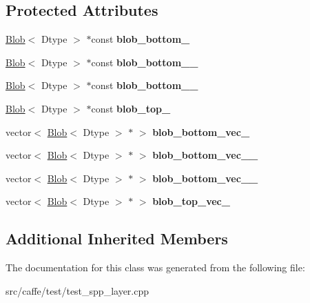 \subsection*{Protected Attributes}
\begin{DoxyCompactItemize}
\item 
\mbox{\label{classcaffe_1_1_s_p_p_layer_test_a3d266526dcb1e6b2292a171839f34f04}} 
\mbox{\hyperlink{classcaffe_1_1_blob}{Blob}}$<$ Dtype $>$ $\ast$const {\bfseries blob\+\_\+bottom\+\_\+}
\item 
\mbox{\label{classcaffe_1_1_s_p_p_layer_test_a2540bbc86b415a5611fcbfc4efa1ef8d}} 
\mbox{\hyperlink{classcaffe_1_1_blob}{Blob}}$<$ Dtype $>$ $\ast$const {\bfseries blob\+\_\+bottom\+\_\+\_\+}
\item 
\mbox{\label{classcaffe_1_1_s_p_p_layer_test_a0982db5f5cb96e571cb3424a46666af8}} 
\mbox{\hyperlink{classcaffe_1_1_blob}{Blob}}$<$ Dtype $>$ $\ast$const {\bfseries blob\+\_\+bottom\+\_\+\_\+}
\item 
\mbox{\label{classcaffe_1_1_s_p_p_layer_test_a018e4388b4f882d0cf4522a494eadcc4}} 
\mbox{\hyperlink{classcaffe_1_1_blob}{Blob}}$<$ Dtype $>$ $\ast$const {\bfseries blob\+\_\+top\+\_\+}
\item 
\mbox{\label{classcaffe_1_1_s_p_p_layer_test_a5103e79478f35ffec4a6ae1d5da611af}} 
vector$<$ \mbox{\hyperlink{classcaffe_1_1_blob}{Blob}}$<$ Dtype $>$ $\ast$ $>$ {\bfseries blob\+\_\+bottom\+\_\+vec\+\_\+}
\item 
\mbox{\label{classcaffe_1_1_s_p_p_layer_test_a230be0a17f73733879881c4a375a17a1}} 
vector$<$ \mbox{\hyperlink{classcaffe_1_1_blob}{Blob}}$<$ Dtype $>$ $\ast$ $>$ {\bfseries blob\+\_\+bottom\+\_\+vec\+\_\+\_\+}
\item 
\mbox{\label{classcaffe_1_1_s_p_p_layer_test_a1144aa3f27192cada385ac245a69fb4a}} 
vector$<$ \mbox{\hyperlink{classcaffe_1_1_blob}{Blob}}$<$ Dtype $>$ $\ast$ $>$ {\bfseries blob\+\_\+bottom\+\_\+vec\+\_\+\_\+}
\item 
\mbox{\label{classcaffe_1_1_s_p_p_layer_test_af636d3ebf3480ef7cad86184494873e9}} 
vector$<$ \mbox{\hyperlink{classcaffe_1_1_blob}{Blob}}$<$ Dtype $>$ $\ast$ $>$ {\bfseries blob\+\_\+top\+\_\+vec\+\_\+}
\end{DoxyCompactItemize}
\subsection*{Additional Inherited Members}


The documentation for this class was generated from the following file\+:\begin{DoxyCompactItemize}
\item 
src/caffe/test/test\+\_\+spp\+\_\+layer.\+cpp\end{DoxyCompactItemize}
